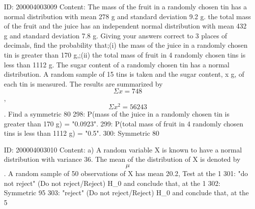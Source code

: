 \documentclass{article}
\begin{document}
ID: 200004003009
Content:
The mass of the fruit in a randomly chosen tin has a normal distribution with mean 278 g and standard deviation 9.2 g. the total mass of the fruit and the juice has an independent normal distribution with mean 432 g and standard deviation 7.8 g. Giving your answers correct to 3 places of decimals, find the probability that;(i) the mass of the juice in a randomly chosen tin is greater than 170 g,;(ii) the total mass of fruit in 4 randomly chosen tins is less than 1112 g. The sugar content of a randomly chosen tin has a normal distribution. A random sample of 15 tins is taken and the sugar content, x g, of each tin is measured. The results are summarized by $$\Sigma x= 748$$, $$\Sigma x^2 = 56243$$. Find a symmetric 80%
298: P(mass of the juice in a randomly chosen tin is greater than 170 g) = "0.0923".
299: P(total mass of fruit in 4 randomly chosen tins is less than 1112 g) = "0.5".
300: Symmetric 80%

ID: 200004003010
Content:
a) A random variable X is known to have a normal distribution with variance 36. The mean of the distribution of X is denoted by $$\mu$$. A random sample of 50 observations of X has mean 20.2, Test at the 1%
301: "do not reject" (Do not reject/Reject) H_0 and conclude that, at the 1%
302: Symmetric 95%
303: "reject" (Do not reject/Reject) H_0 and conclude that, at the 5%
\end{document}
